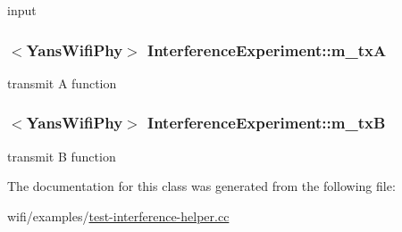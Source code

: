 input 

\subsubsection[{\texorpdfstring{m\+\_\+txA}{m_txA}}]{$<${\bf Yans\+Wifi\+Phy}$>$ Interference\+Experiment\+::m\+\_\+txA\hspace{0.3cm}{\ttfamily [private]}}\hypertarget{classInterferenceExperiment_aac9b38170603ebf4d3c4565deaa8f0a7}{}\label{classInterferenceExperiment_aac9b38170603ebf4d3c4565deaa8f0a7}


transmit A function 

\subsubsection[{\texorpdfstring{m\+\_\+txB}{m_txB}}]{$<${\bf Yans\+Wifi\+Phy}$>$ Interference\+Experiment\+::m\+\_\+txB\hspace{0.3cm}{\ttfamily [private]}}\hypertarget{classInterferenceExperiment_ac2071a3bf35e68a316a7d251327d5708}{}\label{classInterferenceExperiment_ac2071a3bf35e68a316a7d251327d5708}


transmit B function 



The documentation for this class was generated from the following file\+:\begin{DoxyCompactItemize}
\item 
wifi/examples/\hyperlink{test-interference-helper_8cc}{test-\/interference-\/helper.\+cc}\end{DoxyCompactItemize}
